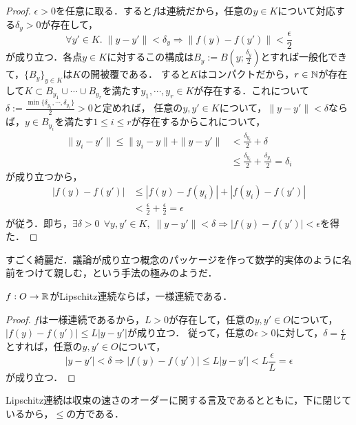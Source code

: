 \documentclass[uplatex,dvipdfmx]{jsreport}
\begin{document}
\begin{proof}
    $\epsilon>0$を任意に取る．すると$f$は連続だから，任意の$y\in K$について対応する$\delta_y>0$が存在して，
    \[ \forall y'\in K.\;\|y-y'\|<\delta_y\Rightarrow\|f(y)-f(y')\|<\frac{\epsilon}{2} \]
    が成り立つ．各点$y\in K$に対するこの構成は$B_y:=B(y;\frac{\delta_y}{2})$とすれば一般化できて，$\{B_y\}_{y\in K}$は$K$の開被覆である．
    すると$K$はコンパクトだから，$r\in\mathbb{N}$が存在して$K\subset B_{y_1}\cup\cdots\cup B_{y_r}$を満たす$y_1,\cdots,y_r\in K$が存在する．これについて$\delta:=\frac{\min\{\delta_{y_1},\cdots,\delta_{y_r}\}}{2}>0$と定めれば，
    任意の$y,y'\in K$について，$\|y-y'\|<\delta$ならば，$y\in B_{y_i}$を満たす$1\le i\le r$が存在するからこれについて，
    \begin{align*}
        \|y_i-y'\| \le \|y_i-y\| + \|y-y'\| &< \frac{\delta_{y_i}}{2} + \delta\\
        &\le \frac{\delta_{y_i}}{2}+\frac{\delta_{y_i}}{2} = \delta_i
    \end{align*}
    が成り立つから，
    \begin{align*}
        |f(y)-f(y')|&\le |f(y)-f(y_i)|+|f(y_i)-f(y')|\\
        &< \frac{\epsilon}{2} + \frac{\epsilon}{2} = \epsilon
    \end{align*}
    が従う．即ち，$\exists\delta>0\,\;\forall y,y'\in K,\; \|y-y'\|<\delta\Rightarrow |f(y)-f(y')|<\epsilon$を得た．
\end{proof}
\begin{remark}
    すごく綺麗だ．議論が成り立つ概念のパッケージを作って数学的実体のように名前をつけて親しむ，という手法の極みのようだ．
\end{remark}
\begin{lemma}[Lipschitz連続ならば一様連続]
    $f:O\to\mathbb{R}$がLipschitz連続ならば，一様連続である．
\end{lemma}
\begin{proof}
    $f$は一様連続であるから，$L>0$が存在して，任意の$y,y'\in O$について，$|f(y)-f(y')|\le L|y-y'|$が成り立つ．
    従って，任意の$\epsilon>0$に対して，$\delta=\frac{\epsilon}{L}$とすれば，任意の$y,y'\in O$について，
    \[ |y-y'|<\delta \Rightarrow |f(y)-f(y')|\le L|y-y'|<L\frac{\epsilon}{L}=\epsilon \]
    が成り立つ．
\end{proof}
\begin{remark}
    Lipschitz連続は収束の速さのオーダーに関する言及であるとともに，下に閉じているから，$\le$の方である．
\end{remark}
\end{document}
